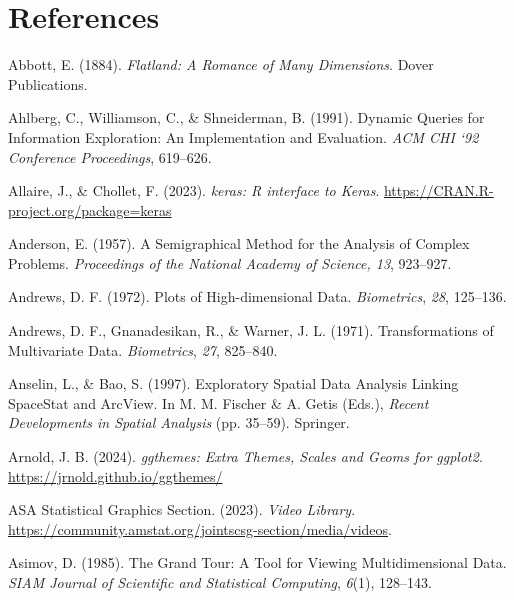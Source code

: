 \documentclass[
  letterpaper,
]{krantz}
\newlength{\cslhangindent}
\newenvironment{CSLReferences}[2] %
 {\begin{list}{}{%
  \setlength{\itemindent}{0pt}
  \setlength{\leftmargin}{0pt}
  \setlength{\parsep}{0pt}
  \ifodd #1
   \setlength{\leftmargin}{\cslhangindent}
   \setlength{\itemindent}{-1\cslhangindent}
  \fi
  \setlength{\itemsep}{#2\baselineskip}}}
 {\end{list}}
\begin{document}
\chapter*{References}\label{references}


\protect{}\label{refs}
\begin{CSLReferences}{1}{0}
Abbott, E. (1884). \emph{Flatland: {A} {R}omance of {M}any
{D}imensions}. Dover Publications.

Ahlberg, C., Williamson, C., \& Shneiderman, B. (1991). Dynamic
{Q}ueries for {I}nformation {E}xploration: {A}n {I}mplementation and
{E}valuation. \emph{ACM CHI `92 Conference Proceedings}, 619--626.

Allaire, J., \& Chollet, F. (2023). \emph{{keras}: {R} interface to
{Keras}}. \url{https://CRAN.R-project.org/package=keras}

Anderson, E. (1957). A {S}emigraphical {M}ethod for the {A}nalysis of
{C}omplex {P}roblems. \emph{Proceedings of the National Academy of
Science, 13}, 923--927.

Andrews, D. F. (1972). {P}lots of {H}igh-dimensional {D}ata.
\emph{Biometrics}, \emph{28}, 125--136.

Andrews, D. F., Gnanadesikan, R., \& Warner, J. L. (1971).
{T}ransformations of {M}ultivariate {D}ata. \emph{Biometrics},
\emph{27}, 825--840.

Anselin, L., \& Bao, S. (1997). {E}xploratory {S}patial {D}ata
{A}nalysis {L}inking {S}pace{S}tat and {A}rc{V}iew. In M. M. Fischer \&
A. Getis (Eds.), \emph{{R}ecent {D}evelopments in {S}patial {A}nalysis}
(pp. 35--59). Springer.

Arnold, J. B. (2024). \emph{{ggthemes}: {E}xtra {T}hemes, {S}cales and
{G}eoms for {ggplot2}}. \url{https://jrnold.github.io/ggthemes/}

ASA Statistical Graphics Section. (2023). \emph{Video {L}ibrary}.
\url{https://community.amstat.org/jointscsg-section/media/videos}.

Asimov, D. (1985). {T}he {G}rand {T}our: {A} {T}ool for {V}iewing
{M}ultidimensional {D}ata. \emph{SIAM Journal of Scientific and
Statistical Computing}, \emph{6}(1), 128--143.


\end{CSLReferences}
\end{document}
